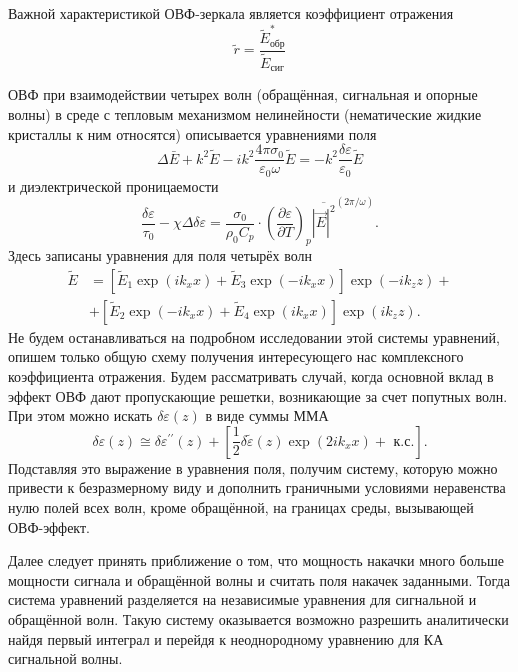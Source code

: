 \documentclass[a5paper,11pt]{extarticle}
\begin{document}
Важной характеристикой ОВФ-зеркала является коэффициент отражения
\begin{equation}
	\tilde{r} = \frac{\tilde{E}^*_\text{обр}}{\tilde{E}_\text{сиг}}
\end{equation}

ОВФ при взаимодействии четырех волн (обращённая, сигнальная и опорные волны) в среде с тепловым механизмом нелинейности (нематические жидкие кристаллы к ним относятся) описывается уравнениями поля
\begin{equation}
\Delta \bar{E}+k^{2} \tilde{E}-i k^{2} \frac{4 \pi \sigma_{0}}{\varepsilon_{0} \omega} \tilde{E}=-k^{2} \frac{\delta \varepsilon}{\varepsilon_{0}} \tilde{E}
\end{equation}
и диэлектрической проницаемости
\begin{equation}
\frac{\delta \varepsilon}{\tau_{0}}-\chi \Delta \delta \varepsilon=\frac{\sigma_{0}}{\rho_{0} C_{p}} \cdot\left(\frac{\partial \varepsilon}{\partial T}\right)_{p} \overline{|\vec{E}|^{2}}^{(2 \pi / \omega)}.
\end{equation}
Здесь записаны уравнения для поля четырёх волн
\begin{equation}
\begin{aligned}
\tilde{E} &=\left[\tilde{E}_{1} \exp \left(i k_{x} x\right)+\tilde{E}_{3} \exp \left(-i k_{x} x\right)\right] \exp \left(-i k_{z} z\right)+\\
&+\left[\widetilde{E}_{2} \exp \left(-i k_{x} x\right)+\widetilde{E}_{4} \exp \left(i k_{x} x\right)\right] \exp \left(i k_{z} z\right).
\end{aligned}
\end{equation}
Не будем останавливаться на подробном исследовании этой системы уравнений, опишем только общую схему получения интересующего нас комплексного коэффициента отражения. Будем рассматривать случай, когда основной вклад в эффект ОВФ дают пропускающие решетки, возникающие за счет попутных волн. При этом можно искать $\delta \varepsilon (z)$ в виде суммы ММА
\begin{equation}
\delta \varepsilon(z) \cong \delta \varepsilon^{\prime \prime}(z)+\left[\frac{1}{2} \delta \tilde{\varepsilon}(z) \exp \left(2 i k_{x} x\right)+ \text{ к.с.}\right].
\end{equation}
Подставляя это выражение в уравнения поля, получим систему, которую можно привести к безразмерному виду и дополнить граничными условиями неравенства нулю полей всех волн, кроме обращённой, на границах среды, вызывающей ОВФ-эффект.

Далее следует принять приближение о том, что мощность накачки много больше мощности сигнала и обращённой волны и считать поля накачек заданными. Тогда система уравнений разделяется на независимые уравнения для сигнальной и обращённой волн. Такую систему оказывается возможно разрешить аналитически найдя первый интеграл и перейдя к неоднородному уравнению для КА сигнальной волны.
\end{document}
